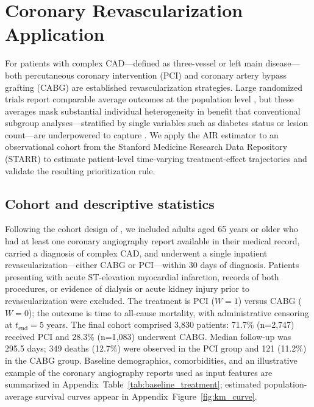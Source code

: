 \documentclass{article}
\newcommand{\tend}{t_{\mathrm{end}}}
\begin{document}


\section{Coronary Revascularization Application}\label{sec:application}

For patients with complex CAD---defined as three-vessel or left main disease---both percutaneous coronary intervention (PCI) and coronary artery bypass grafting (CABG) are established revascularization strategies.
Large randomized trials report comparable average outcomes at the population level \citep{thuijs2019percutaneous}, but these averages mask substantial individual heterogeneity in benefit that conventional subgroup analyses---stratified by single variables such as diabetes status or lesion count---are underpowered to capture \citep{takahashi2020redevelopment}.
We apply the AIR estimator to an observational cohort from the Stanford Medicine Research Data Repository (STARR) \citep{datta2020new} to estimate patient-level time-varying treatment-effect trajectories and validate the resulting prioritization rule.

\subsection{Cohort and descriptive statistics}

Following the cohort design of \citet{takahashi2020redevelopment}, we included adults aged 65 years or older who had at least one coronary angiography report available in their medical record, carried a diagnosis of complex CAD, and underwent a single inpatient revascularization---either CABG or PCI---within 30 days of diagnosis.
Patients presenting with acute ST-elevation myocardial infarction, records of both procedures, or evidence of dialysis or acute kidney injury prior to revascularization were excluded.
The treatment is PCI ($W=1$) versus CABG ($W=0$); the outcome is time to all-cause mortality, with administrative censoring at $\tend = 5$ years.
The final cohort comprised 3{,}830 patients: 71.7\% (n=2{,}747) received PCI and 28.3\% (n=1{,}083) underwent CABG.
Median follow-up was 295.5 days; 349 deaths (12.7\%) were observed in the PCI group and 121 (11.2\%) in the CABG group.
Baseline demographics, comorbidities, and an illustrative example of the coronary angiography reports used as input features are summarized in Appendix~Table~\ref{tab:baseline_treatment}; estimated population-average survival curves appear in Appendix~Figure~\ref{fig:km_curve}.
\end{document}
